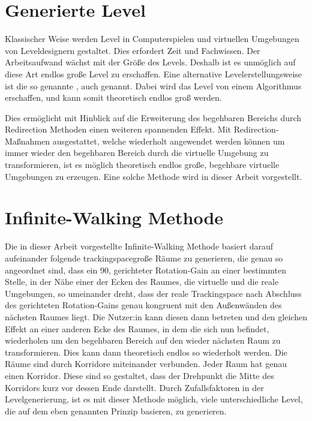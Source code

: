 \section{Generierte Level} %

Klassischer Weise werden Level in Computerspielen und virtuellen Umgebungen von Leveldesignern gestaltet. Dies erfordert Zeit und Fachwissen.
Der Arbeitsaufwand wächst mit der Größe des Levels. Deshalb ist es unmöglich auf diese Art endlos große Level zu erschaffen. Eine alternative Levelerstellungsweise ist die so genannte , auch  genannt. Dabei wird das Level von einem Algorithmus erschaffen, und kann somit theoretisch endlos groß werden.

Dies ermöglicht mit Hinblick auf die Erweiterung des begehbaren Bereichs durch Redirection Methoden einen weiteren spannenden Effekt. %
Mit Redirection-Maßnahmen ausgestattet, welche wiederholt angewendet werden können um immer wieder den begehbaren Bereich durch die virtuelle Umgebung zu transformieren, ist es möglich theoretisch endlos große, begehbare virtuelle Umgebungen zu erzeugen. Eine solche  Methode wird in dieser Arbeit vorgestellt.

\section{Infinite-Walking Methode}
Die in dieser Arbeit vorgestellte Infinite-Walking Methode basiert darauf aufeinander folgende trackingspacegroße Räume zu generieren, die genau so angeordnet sind, dass ein
90\textdegree, gerichteter
Rotation-Gain an einer bestimmten Stelle, in der Nähe einer der Ecken des Raumes, die virtuelle und die reale Umgebungen, so umeinander dreht, dass der reale Trackingspace nach Abschluss des gerichteten Rotation-Gains genau kongruent mit den Außenwänden des nächsten Raumes liegt. Die Nutzer:in kann diesen dann betreten und den gleichen Effekt an einer anderen Ecke des Raumes, in dem die sich nun befindet, wiederholen um den begehbaren Bereich auf den wieder nächsten Raum zu transformieren. Dies kann dann theoretisch endlos so wiederholt werden. Die Räume sind durch Korridore miteinander verbunden. Jeder Raum hat genau einen Korridor. Diese sind so gestaltet, dass der Drehpunkt die Mitte des Korridors kurz vor dessen Ende darstellt. Durch Zufallsfaktoren in der Levelgenerierung, ist es mit dieser Methode möglich, viele unterschiedliche Level, die auf dem eben genannten Prinzip basieren, zu generieren.

